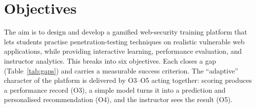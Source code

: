 \section{Objectives}
\label{sec:objectives}

The aim is to design and develop a gamified web-security training platform that lets
students practise penetration-testing techniques on realistic vulnerable web
applications, while providing interactive learning, performance evaluation, and
instructor analytics. This breaks into six objectives. Each closes a gap
(Table~\ref{tab:gaps}) and carries a measurable success criterion. The ``adaptive''
character of the platform is delivered by O3--O5 acting together: scoring produces a
performance record (O3), a simple model turns it into a prediction and personalised
recommendation (O4), and the instructor sees the result (O5).

